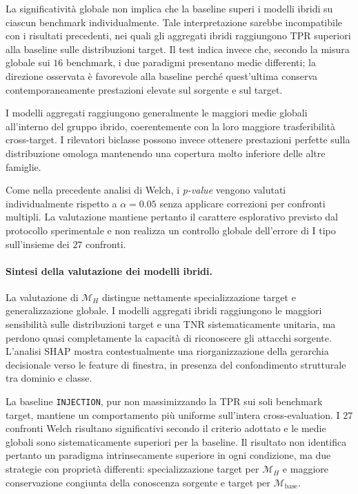 La significatività globale non implica che la baseline superi i modelli ibridi su ciascun benchmark individualmente. 
Tale interpretazione sarebbe incompatibile con i risultati precedenti, nei quali gli aggregati ibridi raggiungono TPR superiori alla baseline sulle distribuzioni target. 
Il test indica invece che, secondo la misura globale sui $16$ benchmark, i due paradigmi presentano medie differenti; la direzione osservata è favorevole alla baseline perché quest'ultima conserva contemporaneamente prestazioni elevate sul sorgente e sul target.

I modelli aggregati raggiungono generalmente le maggiori medie globali all'interno del gruppo ibrido, coerentemente con la loro maggiore trasferibilità cross-target. 
I rilevatori biclasse possono invece ottenere prestazioni perfette sulla distribuzione omologa mantenendo una copertura molto inferiore delle altre famiglie.

Come nella precedente analisi di Welch, i \textit{p-value} vengono valutati individualmente rispetto a $\alpha=0.05$ senza applicare correzioni per confronti multipli. 
La valutazione mantiene pertanto il carattere esplorativo previsto dal protocollo sperimentale e non realizza un controllo globale dell'errore di I tipo sull'insieme dei $27$ confronti.

\paragraph{Sintesi della valutazione dei modelli ibridi.}
La valutazione di $\mathcal{M}_{H}$ distingue nettamente specializzazione target e generalizzazione globale. 
I modelli aggregati ibridi raggiungono le maggiori sensibilità sulle distribuzioni target e una TNR sistematicamente unitaria, ma perdono quasi completamente la capacità di riconoscere gli attacchi sorgente. 
L'analisi SHAP mostra contestualmente una riorganizzazione della gerarchia decisionale verso le feature di finestra, in presenza del confondimento strutturale tra dominio e classe.

La baseline \texttt{INJECTION}, pur non massimizzando la TPR sui soli benchmark target, mantiene un comportamento più uniforme sull'intera cross-evaluation. 
I $27$ confronti Welch risultano significativi secondo il criterio adottato e le medie globali sono sistematicamente superiori per la baseline. 
Il risultato non identifica pertanto un paradigma intrinsecamente superiore in ogni condizione, ma due strategie con proprietà differenti: specializzazione target per $\mathcal{M}_{H}$ e maggiore conservazione congiunta della conoscenza sorgente e target per $\mathcal{M}_{\mathrm{base}}$.

